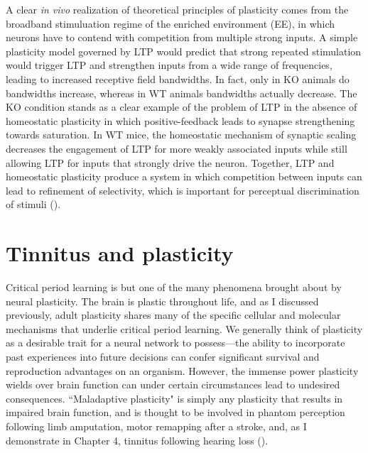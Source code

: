 A clear \textit{in vivo} realization of theoretical principles of plasticity comes from the broadband stimuluation regime of the enriched environment (EE), in which neurons have to contend with competition from multiple strong inputs. A simple plasticity model governed by LTP would predict that strong repeated stimulation would trigger LTP and strengthen inputs from a wide range of frequencies, leading to increased receptive field bandwidths. In fact, only in KO animals do bandwidths increase, whereas in WT animals bandwidths actually decrease. The KO condition stands as a clear example of the problem of LTP in the absence of homeostatic plasticity in which positive-feedback leads to synapse strengthening towards saturation. In WT mice, the homeostatic mechanism of synaptic scaling decreases the engagement of LTP for more weakly associated inputs while still allowing LTP for inputs that strongly drive the neuron. Together, LTP and homeostatic plasticity produce a system in which competition between inputs can lead to refinement of selectivity, which is important for perceptual discrimination of stimuli (\cite{Han2007}).

\section{Tinnitus and plasticity}

Critical period learning is but one of the many phenomena brought about by neural plasticity. The brain is plastic throughout life, and as I discussed previously, adult plasticity shares many of the specific cellular and molecular mechanisms that underlie critical period learning. We generally think of plasticity as a desirable trait for a neural network to possess---the ability to incorporate past experiences into future decisions can confer significant survival and reproduction advantages on an organism. However, the immense power plasticity wields over brain function can under certain circumstances lead to undesired consequences. ``Maladaptive plasticity" is simply any plasticity that results in impaired brain function, and is thought to be involved in phantom perception following limb amputation, motor remapping after a stroke, and, as I demonstrate in Chapter 4, tinnitus following hearing loss (\cite{Flor2006, Takeuchi2012}).


